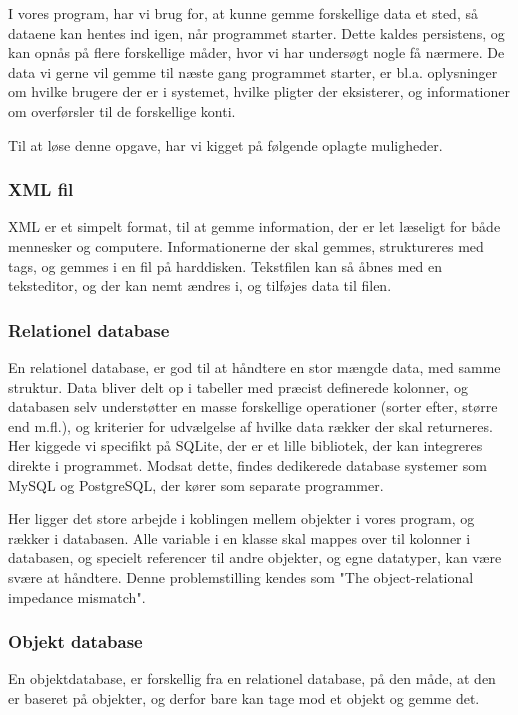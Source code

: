I vores program, har vi brug for, at kunne gemme forskellige data et sted, så dataene kan hentes ind igen, når programmet starter. Dette kaldes persistens, og kan opnås på flere forskellige måder, hvor vi har undersøgt nogle få nærmere.
De data vi gerne vil gemme til næste gang programmet starter, er bl.a. oplysninger om hvilke brugere der er i systemet, hvilke pligter der eksisterer, og informationer om overførsler til de forskellige konti.

Til at løse denne opgave, har vi kigget på følgende oplagte muligheder.

\subsubsection{XML fil}
XML er et simpelt format, til at gemme information, der er let læseligt for både mennesker og computere. Informationerne der skal gemmes, struktureres med tags, og gemmes i en fil på harddisken\cite{xmlspecs}. Tekstfilen kan så åbnes med en teksteditor, og der kan nemt ændres i, og tilføjes data til filen.


\subsubsection{Relationel database}
En relationel database, er god til at håndtere en stor mængde data, med samme struktur. Data bliver delt op i tabeller med præcist definerede kolonner, og databasen selv understøtter en masse forskellige operationer (sorter efter, større end m.fl.), og kriterier for udvælgelse af hvilke data rækker der skal returneres. Her kiggede vi specifikt på SQLite, der er et lille bibliotek, der kan integreres direkte i programmet. Modsat dette, findes dedikerede database systemer som MySQL og PostgreSQL, der kører som separate programmer.

Her ligger det store arbejde i koblingen mellem objekter i vores program, og rækker i databasen. Alle variable i en klasse skal mappes over til kolonner i databasen, og specielt referencer til andre objekter, og egne datatyper, kan være svære at håndtere. Denne problemstilling kendes som "The object-relational impedance mismatch"\cite{ORIM}.

\subsubsection{Objekt database}
En objektdatabase,  er forskellig fra en relationel database, på den måde, at den er baseret på objekter, og derfor bare kan tage mod et objekt og gemme det.

